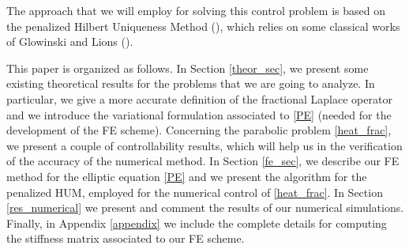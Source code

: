 The approach that we will employ for solving this control problem is based on the penalized Hilbert Uniqueness Method (\cite{boyer2013penalised}), which relies on some classical works of Glowinski and Lions (\cite{glowinski1995exact,glowinski2008exact}).   

This paper is organized as follows. In Section \ref{theor_sec}, we present some existing theoretical results for the problems that we are going to analyze. In particular, we give a more accurate definition of the fractional Laplace operator and we introduce the variational formulation associated to \eqref{PE} (needed for the development of the FE scheme). Concerning the parabolic problem \eqref{heat_frac}, we present a couple of controllability results, which will help us in the verification of the accuracy of the numerical method. In Section \ref{fe_sec}, we describe our FE method for the elliptic equation \eqref{PE} and we present the algorithm for the penalized HUM, employed for the numerical control of \eqref{heat_frac}. In Section \ref{res_numerical} we present and comment the results of our numerical simulations. Finally, in Appendix \ref{appendix} we include the complete details for computing the stiffness matrix associated to our FE scheme.  

